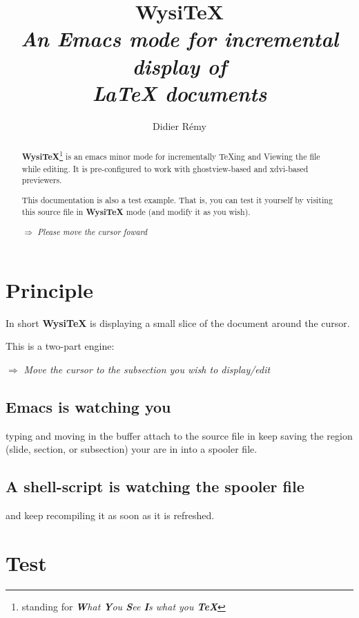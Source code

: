 \documentclass{article}
\def \wysitex{\textbf {WysiTeX}}
\def \instruction #1{\par\medskip \noindent$\Rightarrow$ {\em #1}}
\begin{document}
\pagestyle {empty}

\author {Didier R{\'e}my}

\title {
{\huge \wysitex}
\\[1em]
{\em An {\bfseries Emacs mode} 
for incremental display of \\ 
{\bfseries {\LaTeX} documents}}
}

\maketitle 

\begin{abstract}
{\wysitex}\footnote {standing for {\em {\bf W}hat {\bf Y}ou {\bf S}ee
{\bf I}s what you {\bf TeX}}} is an emacs minor mode for incrementally
TeXing and Viewing the file while editing.
%
It is pre-configured to work with ghostview-based and xdvi-based previewers.

{This documentation is also a test example. That is, you can test it yourself
by visiting this source file in {\wysitex} mode (and modify it as you
wish). }
\instruction 
{Please move the cursor foward}
\end{abstract}


\section {Principle}%

In short {\sc \wysitex} is displaying a small slice of the document around
the cursor. 

This is a two-part engine: 

\instruction 
{Move the cursor to the subsection you wish to display/edit}

\subsection {Emacs is watching you} typing and moving in the buffer attach%
to the source file in keep saving the region (slide, section, or subsection)
your are in  into a spooler file. 

\subsection {A shell-script is watching the spooler file}%
and keep recompiling it as soon as it is refreshed.


\section {Test} %
\end{document}
